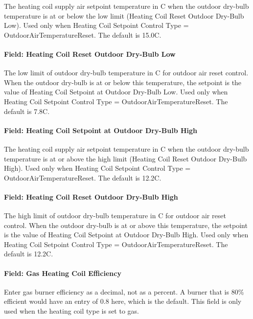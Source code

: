 The heating coil supply air setpoint temperature in C when the outdoor dry-bulb temperature is at or below the low limit (Heating Coil Reset Outdoor Dry-Bulb Low). Used only when Heating Coil Setpoint Control Type = OutdoorAirTemperatureReset. The default is 15.0C.

\paragraph{Field: Heating Coil Reset Outdoor Dry-Bulb Low}\label{field-heating-coil-reset-outdoor-dry-bulb-low-2}

The low limit of outdoor dry-bulb temperature in C for outdoor air reset control. When the outdoor dry-bulb is at or below this temperature, the setpoint is the value of Heating Coil Setpoint at Outdoor Dry-Bulb Low. Used only when Heating Coil Setpoint Control Type = OutdoorAirTemperatureReset. The default is 7.8C.

\paragraph{Field: Heating Coil Setpoint at Outdoor Dry-Bulb High}\label{field-heating-coil-setpoint-at-outdoor-dry-bulb-high-2}

The heating coil supply air setpoint temperature in C when the outdoor dry-bulb temperature is at or above the high limit (Heating Coil Reset Outdoor Dry-Bulb High). Used only when Heating Coil Setpoint Control Type = OutdoorAirTemperatureReset. The default is 12.2C.

\paragraph{Field: Heating Coil Reset Outdoor Dry-Bulb High}\label{field-heating-coil-reset-outdoor-dry-bulb-high-2}

The high limit of outdoor dry-bulb temperature in C for outdoor air reset control. When the outdoor dry-bulb is at or above this temperature, the setpoint is the value of Heating Coil Setpoint at Outdoor Dry-Bulb High. Used only when Heating Coil Setpoint Control Type = OutdoorAirTemperatureReset. The default is 12.2C.

\paragraph{Field: Gas Heating Coil Efficiency}\label{field-gas-heating-coil-efficiency-7}

Enter gas burner efficiency as a decimal, not as a percent. A burner that is 80\% efficient would have an entry of 0.8 here, which is the default. This field is only used when the heating coil type is set to gas.

